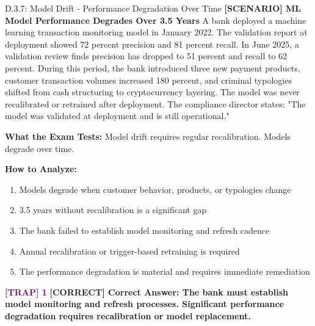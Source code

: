 \documentclass[11pt,a4paper]{beamer}
\newcommand{\trap}[1]{\textcolor{purple}{\textbf{[TRAP] 1}}}
\newcommand{\correct}[1]{\textcolor{green!50!black}{\textbf{[CORRECT] #1}}}
\newcommand{\scenario}[1]{\textcolor{blue!70!black}{\textbf{[SCENARIO] #1}}}
\begin{document}
\begin{frame}{D.3.7: Model Drift - Performance Degradation Over Time}
	\scenario{ML Model Performance Degrades Over 3.5 Years}
	A bank deployed a machine learning transaction monitoring model in January 2022. The validation report at deployment showed 72 percent precision and 81 percent recall. In June 2025, a validation review finds precision has dropped to 51 percent and recall to 62 percent. During this period, the bank introduced three new payment products, customer transaction volumes increased 180 percent, and criminal typologies shifted from cash structuring to cryptocurrency layering. The model was never recalibrated or retrained after deployment. The compliance director states: "The model was validated at deployment and is still operational."
	
	\vspace{0.1cm}
	\textbf{What the Exam Tests:} Model drift requires regular recalibration. Models degrade over time.
	
	\vspace{0.1cm}
	\textbf{How to Analyze:}
	\begin{enumerate}
		\item Models degrade when customer behavior, products, or typologies change
		\item 3.5 years without recalibration is a significant gap
		\item The bank failed to establish model monitoring and refresh cadence
		\item Annual recalibration or trigger-based retraining is required
		\item The performance degradation is material and requires immediate remediation
	\end{enumerate}
	
	\trap{Common Distractor: "The model still has recall above 60 percent, which is acceptable performance."}
	\correct{Correct Answer: The bank must establish model monitoring and refresh processes. Significant performance degradation requires recalibration or model replacement.}
\end{frame}
\end{document}
